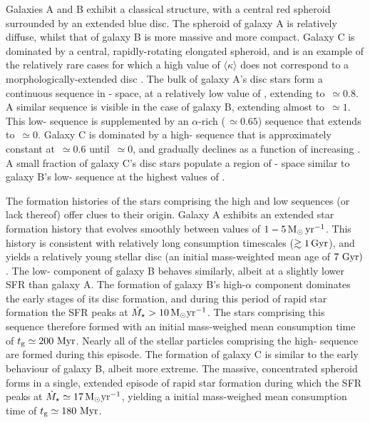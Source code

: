 Galaxies A and B exhibit a classical structure, with a central red spheroid surrounded by an extended blue disc. The spheroid of galaxy A is relatively diffuse, whilst that of galaxy B is more massive and more compact. Galaxy C is dominated by a central, rapidly-rotating elongated spheroid, and is an example of the relatively rare cases for which a high value of $\langle \kappa \rangle$ does not correspond to a morphologically-extended disc \citep[see][]{2017arXiv170406283C}. The bulk of galaxy A's disc stars form a continuous sequence in \afe{}-\feh{} space, at a relatively low value of \afe{}, extending to \feh{}$\,\simeq 0.8$. A similar sequence is visible in the case of galaxy B, extending almost to \feh{}$\,\simeq 1$. This low-\afe{} sequence is supplemented by an $\alpha$-rich (\afe{}$\,\simeq 0.65$) sequence that extends to  \feh{}$\,\simeq 0$. Galaxy C is dominated by a high-\afe{} sequence that is approximately constant at \afe{}$\,\simeq 0.6$ until \feh{}$\,\simeq 0$, and gradually declines as a function of increasing \feh{}. A small fraction of galaxy C's disc stars populate a region of \afe{}-\feh{} space similar to galaxy B's low-\afe{} sequence at the highest values of \feh{}.

The formation histories of the stars comprising the high and low \afe{} sequences (or lack thereof) offer clues to their origin. Galaxy A exhibits an extended star formation history that evolves smoothly between values of $1-5\,{\rm M}_\odot\,{\rm yr}^{-1}$. This history is consistent with relatively long consumption timescales ($\gtrsim 1\,{\rm Gyr}$), and yields a relatively young stellar disc (an initial mass-weighted mean age of $7\ {\rm Gyr})$. The low-\afe{} component of galaxy B behaves similarly, albeit at a slightly lower SFR than galaxy A. The formation of galaxy B's high-$\alpha$ component dominates the early stages of its disc formation, and during this period of rapid star formation the SFR peaks at $\dot{M}_\star > 10\,{\rm M}_\odot {\rm yr}^{-1}$. The stars comprising this sequence therefore formed with an initial mass-weighed mean consumption time of $t_{\rm g} \simeq 200\ {\rm Myr}$. Nearly all of the stellar particles comprising the high-\afe{} sequence are formed during this episode. The formation of galaxy C is similar to the early behaviour of galaxy B, albeit more extreme. The massive, concentrated spheroid forms in a single, extended episode of rapid star formation during which the SFR peaks at $\dot{M}_\star \simeq 17\,{\rm M}_\odot {\rm yr}^{-1}$, yielding a initial mass-weighed mean consumption time of  $t_{\rm g} \simeq 180\ {\rm Myr}$. 

